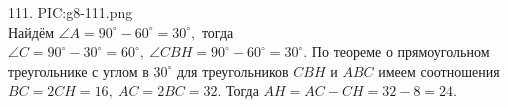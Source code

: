 111. {{PIC:g8-111.png}}\\
Найдём $\angle A=90^\circ-60^\circ=30^\circ,$ тогда $\angle C=90^\circ-30^\circ=60^\circ,\ \angle CBH=90^\circ-60^\circ=30^\circ.$ По теореме о прямоугольном треугольнике с углом в $30^\circ$ для треугольников $CBH$ и $ABC$ имеем соотношения $BC=2CH=16,\ AC=2BC=32.$ Тогда $AH=AC-CH=32-8=24.$\\
